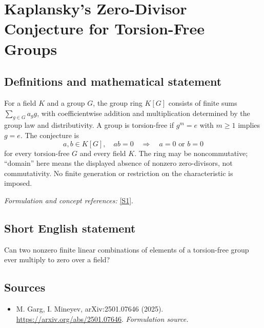 \documentclass[11pt]{article}
\begin{document}
\section*{\texorpdfstring{Kaplansky's Zero-Divisor Conjecture for Torsion-Free Groups}{Kaplansky's Zero-Divisor Conjecture for Torsion-Free Groups}}\label{statement}
\subsection{Definitions and mathematical statement}
For a field $K$ and a group $G$, the group ring $K[G]$ consists of finite sums $\sum_{g\in G}a_gg$, with coefficientwise addition and multiplication determined by the group law and distributivity. A group is torsion-free if $g^m=e$ with $m\ge1$ implies $g=e$. The conjecture is
\[
 a,b\in K[G],\quad ab=0\quad\Longrightarrow\quad a=0\text{ or }b=0
\]
for every torsion-free $G$ and every field $K$. The ring may be noncommutative; ``domain'' here means the displayed absence of nonzero zero-divisors, not commutativity. No finite generation or restriction on the characteristic is imposed.
\par\smallskip\textit{Formulation and concept references:} \href{https://arxiv.org/abs/2501.07646}{[S1]}.

\subsection{Short English statement}
Can two nonzero finite linear combinations of elements of a torsion-free group ever multiply to zero over a field?
\subsection{Sources}
\begin{itemize}
\item[S1]M. Garg, I. Mineyev, arXiv:2501.07646 (2025).
\url{https://arxiv.org/abs/2501.07646}.
\textit{Formulation source.}
\end{itemize}
\end{document}
